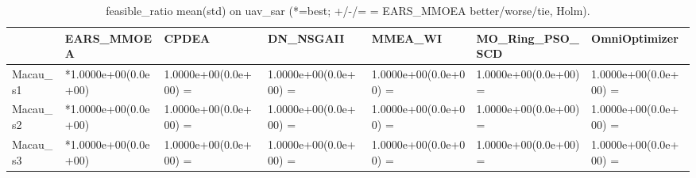 \begin{table}[t]
\centering
\caption{feasible_ratio mean(std) on uav_sar (*=best; +/-/= = EARS_MMOEA better/worse/tie, Holm).}
\label{tab:uav_sar_feasible_ratio}
\begin{tabular}{lllllll}
\toprule
 & EARS\_MMOEA & CPDEA & DN\_NSGAII & MMEA\_WI & MO\_Ring\_PSO\_SCD & OmniOptimizer \\
\midrule
Macau\_s1 & *1.0000e+00(0.0e+00) & 1.0000e+00(0.0e+00) = & 1.0000e+00(0.0e+00) = & 1.0000e+00(0.0e+00) = & 1.0000e+00(0.0e+00) = & 1.0000e+00(0.0e+00) = \\
Macau\_s2 & *1.0000e+00(0.0e+00) & 1.0000e+00(0.0e+00) = & 1.0000e+00(0.0e+00) = & 1.0000e+00(0.0e+00) = & 1.0000e+00(0.0e+00) = & 1.0000e+00(0.0e+00) = \\
Macau\_s3 & *1.0000e+00(0.0e+00) & 1.0000e+00(0.0e+00) = & 1.0000e+00(0.0e+00) = & 1.0000e+00(0.0e+00) = & 1.0000e+00(0.0e+00) = & 1.0000e+00(0.0e+00) = \\
\bottomrule
\end{tabular}
\end{table}
